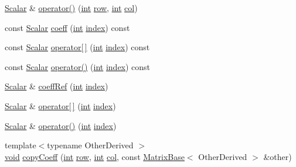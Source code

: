 \begin{DoxyCompactItemize}
\hyperlink{class_matrix_base_a625df8339dc2d816cbc0fd66e7dadaf5}{Scalar} \& \hyperlink{class_matrix_base_a195e578dc9c828880592ae6af3066843}{operator()} (\hyperlink{ioapi_8h_a787fa3cf048117ba7123753c1e74fcd6}{int} \hyperlink{glext_8h_a11b277b422822f784ee248b43eee3e1e}{row}, \hyperlink{ioapi_8h_a787fa3cf048117ba7123753c1e74fcd6}{int} \hyperlink{class_matrix_base_ae3c94b0f25b4273c7a8125169bdf60e0}{col})
\item 
const \hyperlink{class_matrix_base_a625df8339dc2d816cbc0fd66e7dadaf5}{Scalar} \hyperlink{class_matrix_base_a84735f5e73ff08c12f9bf6398bf285a8}{coeff} (\hyperlink{ioapi_8h_a787fa3cf048117ba7123753c1e74fcd6}{int} \hyperlink{glext_8h_ab47dd9958bcadea08866b42bf358e95e}{index}) const 
\item 
const \hyperlink{class_matrix_base_a625df8339dc2d816cbc0fd66e7dadaf5}{Scalar} \hyperlink{class_matrix_base_aba23f8e6f7a011f470cdf0915f2215ec}{operator\mbox{[}$\,$\mbox{]}} (\hyperlink{ioapi_8h_a787fa3cf048117ba7123753c1e74fcd6}{int} \hyperlink{glext_8h_ab47dd9958bcadea08866b42bf358e95e}{index}) const 
\item 
const \hyperlink{class_matrix_base_a625df8339dc2d816cbc0fd66e7dadaf5}{Scalar} \hyperlink{class_matrix_base_aa1a2e558c792649b8ddffae1916e17c1}{operator()} (\hyperlink{ioapi_8h_a787fa3cf048117ba7123753c1e74fcd6}{int} \hyperlink{glext_8h_ab47dd9958bcadea08866b42bf358e95e}{index}) const 
\item 
\hyperlink{class_matrix_base_a625df8339dc2d816cbc0fd66e7dadaf5}{Scalar} \& \hyperlink{class_matrix_base_a879c4671941f0213d61b4cad85f13a72}{coeff\-Ref} (\hyperlink{ioapi_8h_a787fa3cf048117ba7123753c1e74fcd6}{int} \hyperlink{glext_8h_ab47dd9958bcadea08866b42bf358e95e}{index})
\item 
\hyperlink{class_matrix_base_a625df8339dc2d816cbc0fd66e7dadaf5}{Scalar} \& \hyperlink{class_matrix_base_a9384eb1ff789f6f759be3d2b54bc6910}{operator\mbox{[}$\,$\mbox{]}} (\hyperlink{ioapi_8h_a787fa3cf048117ba7123753c1e74fcd6}{int} \hyperlink{glext_8h_ab47dd9958bcadea08866b42bf358e95e}{index})
\item 
\hyperlink{class_matrix_base_a625df8339dc2d816cbc0fd66e7dadaf5}{Scalar} \& \hyperlink{class_matrix_base_a37269187902f726887a0c7742f513ad5}{operator()} (\hyperlink{ioapi_8h_a787fa3cf048117ba7123753c1e74fcd6}{int} \hyperlink{glext_8h_ab47dd9958bcadea08866b42bf358e95e}{index})
\item 
{\footnotesize template$<$typename Other\-Derived $>$ }\\\hyperlink{group___u_a_v_objects_plugin_ga444cf2ff3f0ecbe028adce838d373f5c}{void} \hyperlink{class_matrix_base_a389819761f5868af0bf956f7e40b6689}{copy\-Coeff} (\hyperlink{ioapi_8h_a787fa3cf048117ba7123753c1e74fcd6}{int} \hyperlink{glext_8h_a11b277b422822f784ee248b43eee3e1e}{row}, \hyperlink{ioapi_8h_a787fa3cf048117ba7123753c1e74fcd6}{int} \hyperlink{class_matrix_base_ae3c94b0f25b4273c7a8125169bdf60e0}{col}, const \hyperlink{class_matrix_base}{Matrix\-Base}$<$ Other\-Derived $>$ \&other)

\end{DoxyCompactItemize}

